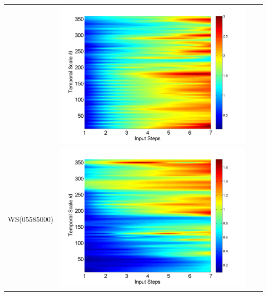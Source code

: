 \documentclass[review]{elsarticle}
\begin{document}
\begin{table}[H]
\begin{tabular}{cccc}
&\begin{minipage}{.3\textwidth}\includegraphics[width=\linewidth]{resultgraph/02143000pepq.png}\end{minipage}
\\
WS(05585000)
&\begin{minipage}{.3\textwidth}\includegraphics[width=\linewidth]{resultgraph/05585000p.png}\end{minipage}

\end{tabular}
\end{table}
\end{document}
